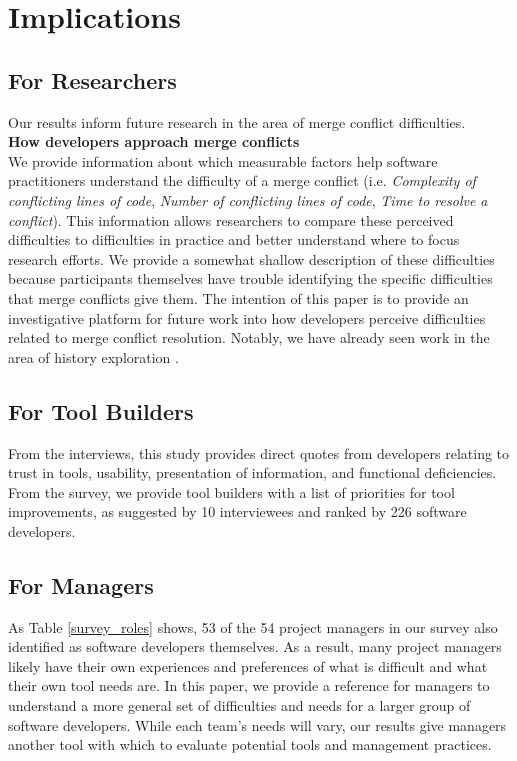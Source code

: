 \section{Implications}\label{implications}
\subsection{For Researchers}
Our results inform future research in the area of merge conflict difficulties.\\

\noindent\textbf{How developers approach merge conflicts}\\

We provide information about which measurable factors help software practitioners understand the difficulty of a merge conflict (i.e. \textit{Complexity of conflicting lines of code}, \textit{Number of conflicting lines of code}, \textit{Time to resolve a conflict}). This information allows researchers to compare these perceived difficulties to difficulties in practice and better understand where to focus research efforts. We provide a somewhat shallow description of these difficulties because participants themselves have trouble identifying the specific difficulties that merge conflicts give them. The intention of this paper is to provide an investigative platform for future work into how developers perceive difficulties related to merge conflict resolution. Notably, we have already seen work in the area of history exploration \cite{mihai_lenses}.
\subsection{For Tool Builders}
From the interviews, this study provides direct quotes from developers relating to trust in tools, usability, presentation of information, and functional deficiencies. From the survey, we provide tool builders with a list of priorities for tool improvements, as suggested by 10 interviewees and ranked by 226 software developers. 
\subsection{For Managers}
As Table \ref{survey_roles} shows, 53 of the 54 project managers in our survey also identified as software developers themselves. As a result, many project managers likely have their own experiences and preferences of what is difficult and what their own tool needs are. In this paper, we provide a reference for managers to understand a more general set of difficulties and needs for a larger group of software developers. While each team's needs will vary, our results give managers another tool with which to evaluate potential tools and management practices.
